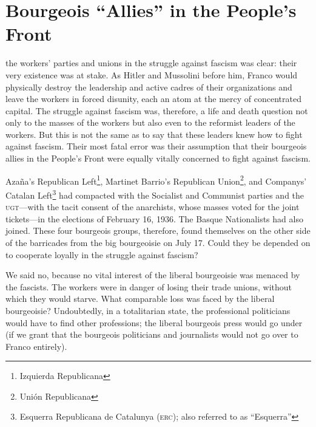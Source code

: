 \chapter{Bourgeois “Allies” in the People's Front}

 the workers’ parties and unions in the struggle against fascism was clear: their very existence was at stake. As Hitler and Mussolini before him, Franco{\indexFFranco} would physically destroy the leadership and active cadres of their organizations and leave the workers in forced disunity, each an atom at the mercy of concentrated capital. The struggle against fascism was, therefore, a life and death question not only to the masses of the workers but also even to the reformist leaders of the workers. But this is not the same as to say that these leaders knew how to fight against fascism. Their most fatal error was their assumption that their bourgeois allies in the People’s Front were equally vitally concerned to fight against fascism.

Azaña's Republican Left\footnote{Izquierda Republicana}, Martinet Barrio's Republican Union\footnote{Unión Republicana}, and Companys' Catalan Left\footnote{Esquerra Republicana de Catalunya (\textsc{erc}); also referred to as ``Esquerra''} had compacted with the Socialist and Communist parties and the \textsc{ugt}---with the tacit consent of the anarchists, whose masses voted for the joint tickets---in the elections of February 16, 1936. The Basque Nationalists had also joined. These four bourgeois groups, therefore, found themselves on the other side of the barricades from the big bourgeoisie on July 17. Could they be depended on to cooperate loyally in the struggle against fascism?

We said no, because no vital interest of the liberal bourgeoisie was menaced by the fascists. The workers were in danger of losing their trade unions, without which they would starve. What comparable loss was faced by the liberal bourgeoisie? Undoubtedly, in a totalitarian state, the professional politicians would have to find other professions; the liberal bourgeois press would go under (if we grant that the bourgeois politicians and journalists would not go over to Franco entirely).
\noclub

